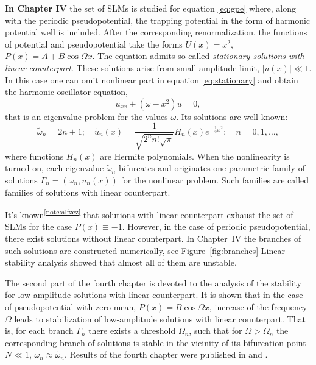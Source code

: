 \documentclass[candidate, href, colorlinks]{disser}
\begin{document}
\textbf{In Chapter IV} the set of SLMs is studied for equation \eqref{eq:gpe} where, along with the periodic pseudopotential, the trapping potential in the form of harmonic potential well is included.
After the corresponding renormalization, the functions of potential and pseudopotential take the forms $U(x) = x^2$, $P(x) = A + B \cos \Omega x$.
The equation admits so-called {\it stationary solutions with linear counterpart}.
These solutions arise from small-amplitude limit, $|u(x)| \ll 1$.
In this case one can omit nonlinear part in equation \eqref{eq:stationary} and obtain the harmonic oscillator equation,
\begin{equation}
	u_{xx} + (\omega - x^2) u = 0,
\end{equation}
that is an eigenvalue problem for the values $\omega$.
Its solutions are well-known:
\begin{equation}
	\tilde{\omega}_n = 2n + 1; \quad \tilde{u}_n(x) = \dfrac{1}{\sqrt{2^n n! \sqrt{\pi}}} H_n(x) e^{-\frac{1}{2} x^2}; \quad n = 0, 1, \dots,
\label{eq:ho}
\end{equation}
where functions $H_n(x)$ are Hermite polynomials.
When the nonlinearity is turned on, each eigenvalue $\tilde{\omega}_n$ bifurcates and originates one-parametric family of solutions $\Gamma_n = (\omega_n, u_n(x))$ for the nonlinear problem.
Such families are called families of solutions with linear counterpart. 

It's known\textsuperscript{\ref{note:alfzez}} that solutions with linear counterpart exhaust the set of SLMs for the case $P(x) \equiv -1$.
However, in the case of periodic pseudopotential, there exist solutions without linear counterpart.
In Chapter~IV the branches of such solutions are constructed numerically, see Figure~\ref{fig:branches}
Linear stability analysis showed that almost all of them are unstable.

The second part of the fourth chapter is devoted to the analysis of the stability for low-amplitude solutions with linear counterpart.
It is shown that in the case of pseudopotential with zero-mean, $P(x) = B \cos \Omega x$, increase of the frequency $\Omega$ leads to stabilization of low-amplitude solutions with linear counterpart.
That is, for each branch $\Gamma_n$ there exists a threshold $\Omega_n$, such that for $\Omega > \Omega_n$ the corresponding branch of solutions is stable in the vicinity of its bifurcation point $N \ll 1$, $\omega_n \approx \tilde{\omega}_n$.
Results of the fourth chapter were published in \cite{AlfimovGegelLebedevMalomedZezyulin} and \cite{Bannoe2018}.
\end{document}

